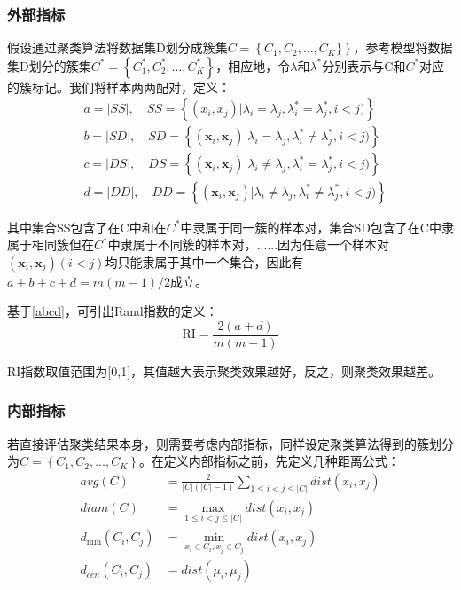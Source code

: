 \subsubsection{外部指标}
假设通过聚类算法将数据集D划分成簇集$C=\left\{C_1,C_2,...,C_K\}\right\}$，参考模型将数据集D划分的簇集$C^*=\left\{ C_{1}^{*},C_{2}^{*},...,C_{K}^{*} \right\} $，相应地，令$\lambda$和$\lambda^{*}$分别表示与C和$C^{*}$对应的簇标记。我们将样本两两配对，定义：
\begin{equation}
\label{abcd}
\begin{aligned}
&\left.a=|S S|, \quad S S=\left\{(x_{i}, x_{j}) | \lambda_{i}=\lambda_{j}, \lambda_{i}^{*}=\lambda_{j}^{*}, i<j)\right\}\\
&\left.b=|S D|, \quad S D=\left\{(\boldsymbol{x}_{i}, \boldsymbol{x}_{j}) | \lambda_{i}=\lambda_{j}, \lambda_{i}^{*} \neq \lambda_{j}^{*}, i<j)\right\}\\
&\left.c=|D S|, \quad D S=\left\{(\boldsymbol{x}_{i}, \boldsymbol{x}_{j}) | \lambda_{i} \neq \lambda_{j}, \lambda_{i}^{*}=\lambda_{j}^{*}, i<j)\right\}\\
&\left.d=|D D|, \quad D D=\left\{(\boldsymbol{x}_{i}, \boldsymbol{x}_{j}) | \lambda_{i} \neq \lambda_{j}, \lambda_{i}^{*} \neq \lambda_{j}^{*}, i<j)\right\}
\end{aligned}
\end{equation}

其中集合SS包含了在C中和在$C^{*}$中隶属于同一簇的样本对，集合SD包含了在C中隶属于相同簇但在$C^{*}$中隶属于不同簇的样本对，......因为任意一个样本对$\left(\boldsymbol{x}_{i}, \boldsymbol{x}_{j}\right)(i<j)$均只能隶属于其中一个集合，因此有$a+b+c+d=m(m-1) / 2$成立。

基于\ref{abcd}，可引出Rand指数的定义：
\begin{equation}
\label{RI}
\mathrm{RI}=\frac{2(a+d)}{m(m-1)}
\end{equation}

RI指数取值范围为[0,1]，其值越大表示聚类效果越好，反之，则聚类效果越差。

\subsubsection{内部指标}

若直接评估聚类结果本身，则需要考虑内部指标，同样设定聚类算法得到的簇划分为$C=\left\{C_1,C_2,...,C_K\right\}$。在定义内部指标之前，先定义几种距离公式：
\begin{equation}
\label{distance}
\begin{aligned}
avg(C) &=\frac{2}{|C|(|C|-1)} \sum_{1 \leqslant i<j \leqslant|C|} dist\left(x_{i}, x_{j}\right) \\
diam(C) &=\max _{1 \leqslant i<j \leqslant|C|} dist\left(x_{i}, x_{j}\right) \\
d_{\min }\left(C_{i}, C_{j}\right) &=\min _{x_{i} \in C_{i}, x_{j} \in C_{j}} dist\left(x_{i}, x_{j}\right) \\
d_{cen}\left(C_{i}, C_{j}\right) &=dist\left(\mu_{i}, \mu_{j}\right)
\end{aligned}
\end{equation}

